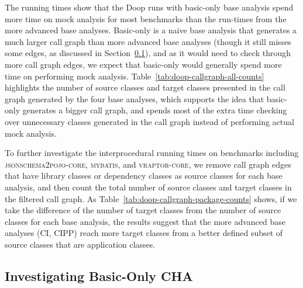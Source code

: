The running times show that the Doop runs with basic-only base analysis spend more time on mock analysis for most benchmarks than the run-times from the more advanced base analyses. Basic-only is a naive base analysis that generates a much larger call graph than more advanced base analyses (though it still misses some edges, as discussed in Section~\ref{subsec:basic-only-cha}), and as it would need to check through more call graph edges, we expect that basic-only would generally spend more time on performing mock analysis. Table~\ref{tab:doop-callgraph-all-counts} highlights the number of source classes and target classes presented in the call graph generated by the four base analyses, which supports the idea that basic-only generates a bigger call graph, and spends most of the extra time checking over unnecessary classes generated in the call graph instead of performing actual mock analysis.

To further investigate the interprocedural running times on benchmarks including \textsc{jsonschema2pojo-core}, \textsc{mybatis}, and \textsc{vraptor-core}, we remove call graph edges that have library classes or dependency classes as source classes for each base analysis, and then count the total number of source classes and target classes in the filtered call graph. As Table~\ref{tab:doop-callgraph-package-counts} shows, if we take the difference of the number of target classes from the number of source classes for each base analysis, the results suggest that the more advanced base analyses (CI, CIPP) reach more target classes from a better defined subset of source classes that are application classes. 

\subsection{Investigating Basic-Only CHA}
\label{subsec:basic-only-cha}

